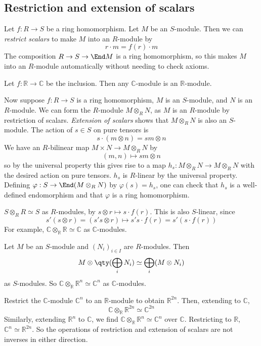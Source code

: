 \subsection{Restriction and extension of scalars}
Let \( f : R \to S \) be a ring homomorphism.
Let \( M \) be an \( S \)-module.
Then we can \emph{restrict scalars} to make \( M \) into an \( R \)-module by
\[ r \cdot m = f(r) \cdot m \]
The composition \( R \to S \to \End M \) is a ring homomorphism, so this makes \( M \) into an \( R \)-module automatically without needing to check axioms.
\begin{example}
    Let \( f : \mathbb R \to \mathbb C \) be the inclusion.
    Then any \( \mathbb C \)-module is an \( \mathbb R \)-module.
\end{example}

Now suppose \( f : R \to S \) is a ring homomorphism, \( M \) is an \( S \)-module, and \( N \) is an \( R \)-module.
We can form the \( R \)-module \( M \otimes_R N \), as \( M \) is an \( R \)-module by restriction of scalars.
\emph{Extension of scalars} shows that \( M \otimes_R N \) is also an \( S \)-module.
The action of \( s \in S \) on pure tensors is
\[ s \cdot (m \otimes n) = sm \otimes n \]
We have an \( R \)-bilinear map \( M \times N \to M \otimes_R N \) by
\[ (m, n) \mapsto sm \otimes n \]
so by the universal property this gives rise to a map \( h_s : M \otimes_R N \to M \otimes_R N \) with the desired action on pure tensors.
\( h_s \) is \( R \)-linear by the universal property.
Defining \( \varphi : S \to \End(M \otimes_R N) \) by \( \varphi(s) = h_s \), one can check that \( h_s \) is a well-defined endomorphism and that \( \varphi \) is a ring homomorphism.
\begin{example}
    \( S \otimes_R R \simeq S \) as \( R \)-modules, by \( s \otimes r \mapsto s \cdot f(r) \).
    This is also \( S \)-linear, since
    \[ s'(s \otimes r) = (s's \otimes r) \mapsto s's \cdot f(r) = s'(s \cdot f(r)) \]
    For example, \( \mathbb C \otimes_{\mathbb R} \mathbb R \simeq \mathbb C \) as \( \mathbb C \)-modules.
\end{example}
\begin{example}
    Let \( M \) be an \( S \)-module and \( (N_i)_{i \in I} \) are \( R \)-modules.
    Then
    \[ M \otimes \qty(\bigoplus_i N_i) \simeq \bigoplus_i (M \otimes N_i) \]
    as \( S \)-modules.
    So \( \mathbb C \otimes_{\mathbb R} \mathbb R^n \simeq \mathbb C^n \) as \( \mathbb C \)-modules.
\end{example}
\begin{example}
    Restrict the \( \mathbb C \)-module \( \mathbb C^n \) to an \( \mathbb R \)-module to obtain \( \mathbb R^{2n} \).
    Then, extending to \( \mathbb C \),
    \[ \mathbb C \otimes_{\mathbb R} \mathbb R^{2n} \simeq \mathbb C^{2n} \]
    Similarly, extending \( \mathbb R^n \) to \( \mathbb C \), we find \( \mathbb C \otimes_{\mathbb R} \mathbb R^n \simeq \mathbb C^n \) over \( \mathbb C \).
    Restricting to \( \mathbb R \), \( \mathbb C^n \simeq \mathbb R^{2n} \).
    So the operations of restriction and extension of scalars are not inverses in either direction.
\end{example}
